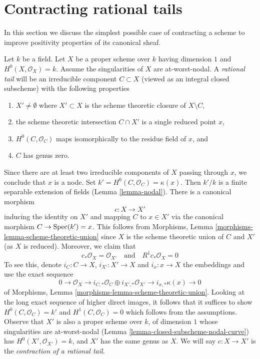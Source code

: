 \section{Contracting rational tails}
\label{section-contracting-rational-tails}

\noindent
In this section we discuss the simplest possible case of contracting
a scheme to improve positivity properties of its canonical sheaf.

\begin{example}
\label{example-rational-tail}
Let $k$ be a field. Let $X$ be a proper scheme over $k$ having dimension $1$
and $H^0(X, \mathcal{O}_X) = k$. Assume the singularities of $X$ are
at-worst-nodal.
A {\it rational tail} will be an irreducible component $C \subset X$
(viewed as an integral closed subscheme) with the following properties
\begin{enumerate}
\item $X' \not = \emptyset$ where $X' \subset X$ is the scheme theoretic closure
of $X \setminus C$,
\item the scheme theoretic intersection $C \cap X'$ is a single
reduced point $x$,
\item $H^0(C, \mathcal{O}_C)$ maps isomorphically to the
residue field of $x$, and
\item $C$ has genus zero.
\end{enumerate}
Since there are at least two irreducible components of $X$ passing through
$x$, we conclude that $x$ is a node.
Set $k' = H^0(C, \mathcal{O}_C) = \kappa(x)$.
Then $k'/k$ is a finite separable extension of fields
(Lemma \ref{lemma-nodal}). There is a canonical morphism
$$
c : X \longrightarrow X'
$$
inducing the identity on $X'$ and mapping $C$ to $x \in X'$
via the canonical morphism $C \to \mathop{\mathrm{Spec}}(k') = x$. This follows from
Morphisms, Lemma \ref{morphisms-lemma-scheme-theoretic-union}
since $X$ is the scheme theoretic union of $C$ and $X'$ (as $X$ is reduced).
Moreover, we claim that
$$
c_*\mathcal{O}_X = \mathcal{O}_{X'}
\quad\text{and}\quad
R^1c_*\mathcal{O}_X = 0
$$
To see this, denote $i_C : C \to X$, $i_{X'} : X' \to X$ and $i_x : x \to X$
the embeddings and use the exact sequence
$$
0 \to \mathcal{O}_X \to
i_{C, *}\mathcal{O}_C \oplus i_{X', *}\mathcal{O}_{X'} \to
i_{x, *}\kappa(x) \to 0
$$
of Morphisms, Lemma \ref{morphisms-lemma-scheme-theoretic-union}.
Looking at the long exact sequence of higher direct images,
it follows that it suffices to show $H^0(C, \mathcal{O}_C) = k'$
and $H^1(C, \mathcal{O}_C) = 0$ which follows from the assumptions.
Observe that $X'$ is also a proper scheme over $k$, of dimension $1$
whose singularities are at-worst-nodal
(Lemma \ref{lemma-closed-subscheme-nodal-curve})
has $H^0(X', \mathcal{O}_{X'}) = k$, and
$X'$ has the same genus as $X$.
We will say $c : X \to X'$ is the
{\it contraction of a rational tail}.
\end{example}

